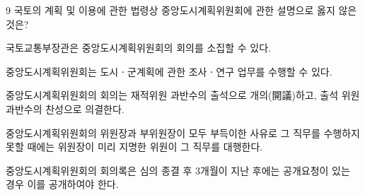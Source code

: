 \begin{question}{9}
국토의 계획 및 이용에 관한 법령상 중앙도시계획위원회에 관한 설명으로 옳지 않은 것은?
\begin{choices}
  \item 국토교통부장관은 중앙도시계획위원회의 회의를 소집할 수 있다.
  \item 중앙도시계획위원회는 도시ㆍ군계획에 관한 조사ㆍ연구 업무를 수행할 수 있다.
  \item 중앙도시계획위원회의 회의는 재적위원 과반수의 출석으로 개의(開議)하고, 출석 위원 과반수의 찬성으로 의결한다.
  \item 중앙도시계획위원회의 위원장과 부위원장이 모두 부득이한 사유로 그 직무를 수행하지 못할 때에는 위원장이 미리 지명한 위원이 그 직무를 대행한다.
  \item 중앙도시계획위원회의 회의록은 심의 종결 후 3개월이 지난 후에는 공개요청이 있는 경우 이를 공개하여야 한다.
\end{choices}
\end{question}
